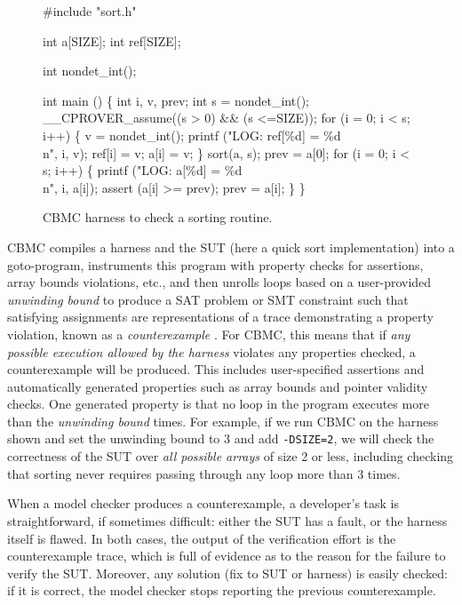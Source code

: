 \documentclass[conference]{IEEEtran}
\begin{document}
\begin{figure}
{\scriptsize
\begin{code}
\#include "sort.h"

int a[SIZE];
int ref[SIZE];

int nondet\_int();

int main () \{
  int i, v, prev;
  int s = nondet\_int();
  \_\_CPROVER\_assume((s > 0) \&\& (s <=SIZE));
  for (i = 0; i < s; i++) \{
    v = nondet\_int();
    printf ("LOG: ref[\%d] = \%d\\n", i, v);
    ref[i] = v; a[i] = v;
  \}
  sort(a, s);
  prev = a[0];
  for (i = 0; i < s; i++) \{
    printf ("LOG: a[\%d] = \%d\\n", i, a[i]);
    assert (a[i] >= prev);
    prev = a[i];
  \}
\}
\end{code}
}
\caption{CBMC harness to check a sorting routine.}
\label{fig:sortharness}
\end{figure}

CBMC compiles a harness and the SUT (here a quick sort implementation)
into a goto-program, instruments this program with property checks for
assertions, array bounds violations, etc., and then unrolls loops
based on a user-provided \emph{unwinding bound} to produce a SAT
problem or SMT constraint such that satisfying assignments are
representations of a trace demonstrating a property violation, known
as a \emph{counterexample} \cite{CountWitness}.  For CBMC, this means
that if \emph{any possible execution allowed by the harness} violates
any properties checked, a counterexample will be produced.  This
includes user-specified assertions and automatically generated
properties such as array bounds and pointer validity checks. One
generated property is that no loop in the program executes more than
the \emph{unwinding bound} times.  For example, if we run CBMC on the
harness shown and set the unwinding bound to 3 and add {\tt -DSIZE=2},
we will check the correctness of the SUT over \emph{all possible
  arrays} of size 2 or less, including checking that sorting never
requires passing through any loop more than 3 times.

When a model checker produces a counterexample, a developer's task is
straightforward, if sometimes difficult: either the SUT has a fault,
or the harness itself is flawed.  In both cases, the output of the
verification effort is the counterexample trace, which is full of
evidence as to the reason for the failure to verify the SUT. Moreover,
any solution (fix to SUT or harness) is easily checked: if it is
correct, the model checker stops reporting the previous
counterexample.  
\end{document}
